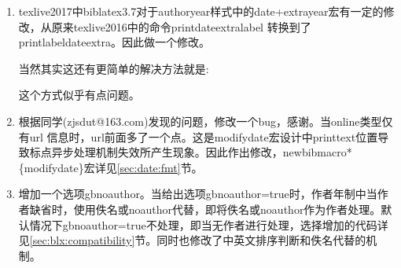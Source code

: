 \label{up:170411}
\begin{enumerate}
\item texlive2017中biblatex3.7对于authoryear样式中的date+extrayear宏有一定的修改，从原来texlive2016中的命令printdateextralabel 转换到了printlabeldateextra。因此做一个修改。
    \begin{texlist}
\iftoggle{iftexliveseven}{%
  \renewbibmacro*{date+extrayear}{%
    \iffieldundef{labelyear}
      {}
      {\printtext{%
         \iffieldsequal{year}{labelyear}
           {\printlabeldateextra}%
           {\printfield{labelyear}%
            \printfield{extrayear}}}}}%
}{%
\renewbibmacro*{date+extrayear}{%
    \iffieldundef{\thefield{datelabelsource}year}
      {}
      {\printtext{%
         \iffieldsequal{year}{\thefield{datelabelsource}year}
           {\printdateextralabel}%
           {\printfield{labelyear}%
            \printfield{extrayear}}}}}%
}
    \end{texlist}

    当然其实这还有更简单的解决方法就是:
    \begin{texlist}
    \let\printdateextralabel=\printlabeldateextra
    \end{texlist}
    这个方式似乎有点问题。

\item 根据同学(zjsdut@163.com)发现的问题，修改一个bug，感谢。当online类型仅有url 信息时，url前面多了一个点。这是modifydate宏设计中printtext位置导致标点异步处理机制失效所产生现象。因此作出修改，newbibmacro*\{modifydate\}宏详见\ref{sec:date:fmt}节。


\item 增加一个选项gbnoauthor。当给出选项gbnoauthor=true时，作者年制中当作者缺省时，使用佚名或noauthor代替，即将佚名或noauthor作为作者处理。默认情况下gbnoauthor=true不处理，即当无作者进行处理，选择增加的代码详见\ref{sec:blx:compatibility}节。同时也修改了中英文排序判断和佚名代替的机制。
    \begin{texlist}
        \map{%
            \step[fieldsource=author,match=\regexp{[^a-zA-Z\s\.\,\'\{\}\-\:0-9]},final]
            \step[fieldset=userb,fieldvalue={cn}]
            }
        \map{%
            \step[fieldsource=title,match=\regexp{[^a-zA-Z\s\.\,\'\{\}\-\:0-9]},final]
            \step[fieldset=userb,fieldvalue={cn}]
            }%
        \map{%
            \step[fieldset=userb,fieldvalue={en}]
            }
    \end{texlist}


\end{enumerate}

